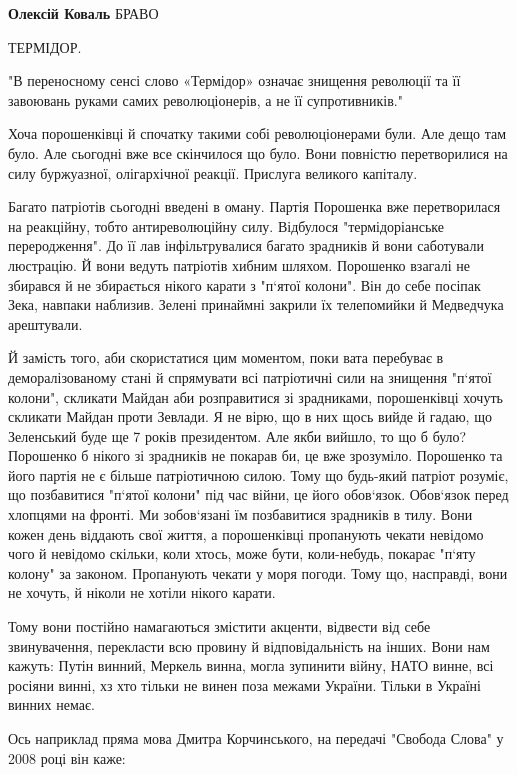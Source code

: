 \begin{itemize}
\begin{itemize}
\textbf{Олексій Коваль} БРАВО


ТЕРМІДОР.

"В переносному сенсі слово «Термідор» означає знищення революції та її
завоювань руками самих революціонерів, а не її супротивників."

Хоча порошенківці й спочатку такими собі революціонерами були. Але дещо там
було. Але сьогодні вже все скінчилося що було. Вони повністю перетворилися на
силу буржуазної, олігархічної реакції. Прислуга великого капіталу.

Багато патріотів сьогодні введені в оману. Партія Порошенка вже перетворилася
на реакційну, тобто антиреволюційну силу. Відбулося "термідоріанське
переродження". До її лав інфільтрувалися багато зрадників й вони саботували
люстрацію. Й вони ведуть патріотів хибним шляхом. Порошенко взагалі не збирався
й не збирається нікого карати з "п`ятої колони". Він до себе посіпак Зека,
навпаки наблизив. Зелені принаймні закрили їх телепомийки й Медведчука
арештували.

Й замість того, аби скористатися цим моментом, поки вата перебуває в
деморалізованому стані й спрямувати всі патріотичні сили на знищення "п`ятої
колони", скликати Майдан аби розправитися зі зрадниками, порошенківці хочуть
скликати Майдан проти Зевлади. Я не вірю, що в них щось вийде й гадаю, що
Зеленський буде ще 7 років президентом. Але якби вийшло, то що б було?
Порошенко б нікого зі зрадників не покарав би, це вже зрозуміло. Порошенко та
його партія не є більше патріотичною силою. Тому що будь-який патріот розуміє,
що позбавитися "п`ятої колони" під час війни, це його обов`язок. Обов`язок
перед хлопцями на фронті. Ми зобов`язані їм позбавитися зрадників в тилу. Вони
кожен день віддають свої життя, а порошенківці пропанують чекати невідомо чого
й невідомо скільки, коли хтось, може бути, коли-небудь, покарає "п`яту колону"
за законом. Пропанують чекати у моря погоди. Тому що, насправді, вони не
хочуть, й ніколи не хотіли нікого карати.

Тому вони постійно намагаються змістити акценти, відвести від себе
звинувачення, перекласти всю провину й відповідальність на інших. Вони нам
кажуть: Путін винний, Меркель винна, могла зупинити війну, НАТО винне, всі
росіяни винні, хз хто тільки не винен поза межами України. Тільки в Україні
винних немає.

Ось наприклад пряма мова Дмитра Корчинського, на передачі "Свобода Слова" у
2008 році він каже:


\end{itemize}
\end{itemize}
